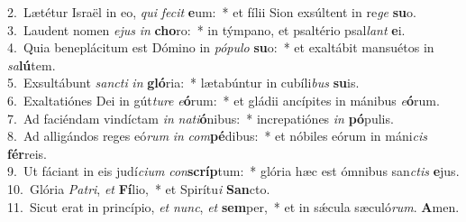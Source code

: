 {2.~}Lætétur Israël in eo, \textit{qui} \textit{fe}\textit{cit} \textbf{e}um:~* et fílii Sion exsúltent in re\textit{ge} \textbf{su}o.\\
{3.~}Laudent nomen \textit{e}\textit{jus} \textit{in} \textbf{cho}ro:~* in týmpano, et psaltério psal\textit{lant} \textbf{e}i.\\
{4.~}Quia beneplácitum est Dómino in \textit{pó}\textit{pu}\textit{lo} \textbf{su}o:~* et exaltábit mansuétos in \textit{sa}\textbf{lú}tem.\\
{5.~}Exsultábunt \textit{san}\textit{cti} \textit{in} \textbf{gló}ria:~* lætabúntur in cubíli\textit{bus} \textbf{su}is.\\
{6.~}Exaltatiónes Dei in gút\textit{tu}\textit{re} \textit{e}\textbf{ó}rum:~* et gládii ancípites in mánibus \textit{e}\textbf{ó}rum.\\
{7.~}Ad faciéndam vindíctam \textit{in} \textit{na}\textit{ti}\textbf{ó}nibus:~* increpatiónes \textit{in} \textbf{pó}pulis.\\
{8.~}Ad alligándos reges eó\textit{rum} \textit{in} \textit{com}\textbf{pé}dibus:~* et nóbiles eórum in máni\textit{cis} \textbf{fér}reis.\\
{9.~}Ut fáciant in eis judí\textit{ci}\textit{um} \textit{con}\textbf{scríp}tum:~* glória hæc est ómnibus san\textit{ctis} \textbf{e}jus.\\
{10.~}Glória \textit{Pa}\textit{tri}, \textit{et} \textbf{Fí}lio,~* et Spirítu\textit{i} \textbf{San}cto.\\
{11.~}Sicut erat in princípio, \textit{et} \textit{nunc}, \textit{et} \textbf{sem}per,~* et in sǽcula sæculó\textit{rum}. \textbf{A}men.\\
